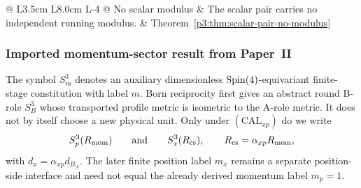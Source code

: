 \documentclass[12pt,a4paper]{article}
\begin{document}
\begin{table}[H]
\begin{tabular}{@{}
  L{3.5cm}
  L{8.0cm}
  L{\dimexpr\linewidth-11.5cm-4\tabcolsep\relax}
@{}}
No scalar modulus
& The scalar pair carries no independent running modulus.
& Theorem~\ref{p3:thm:scalar-pair-no-modulus} \\
\bottomrule
\end{tabular}
\caption[Born reciprocal completion ledger]{Born reciprocal completion ledger.}
\label{tab:p3-born-completion-ledger}
\endgroup
\end{table}


\subsubsection{Imported momentum-sector result from Paper~II}

\begin{remark}
The symbol \(S^3_m\) denotes an auxiliary dimensionless \(\mathrm{Spin}(4)\)-equivariant
finite-stage constitution with label \(m\).  Born reciprocity first gives an
abstract round B-role \(S^3_B\) whose transported profile metric is isometric to
the A-role metric.  It does not by itself choose a new physical unit.  Only under
\((\mathrm{CAL}_{xp})\) do we write
\[
        S^3_p(R_{\mathrm{mom}})\qquad\text{and}\qquad S^3_x(R_{\mathrm{cs}}),
        \qquad R_{\mathrm{cs}}=\alpha_{xp}R_{\mathrm{mom}},
\]
with \(d_x=\alpha_{xp}d_{B_A}\).  The later finite position label \(m_x\) remains
a separate position-side interface and need not equal the already derived
momentum label \(m_p=1\).
\end{remark}
\end{document}
